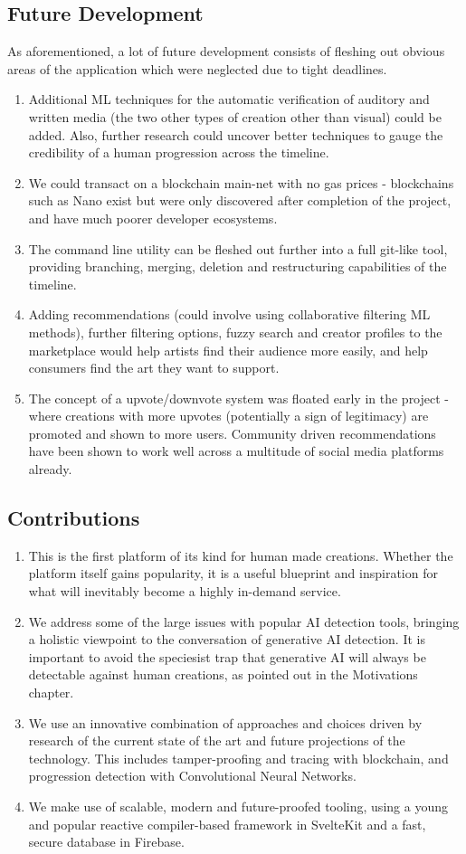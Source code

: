 \documentclass[12pt,a4paper]{article}
\begin{document}
\subsection{Future Development}
As aforementioned, a lot of future development consists of fleshing out obvious areas of the application which were neglected due to tight deadlines.
\begin{enumerate}
    \item Additional ML techniques for the automatic verification of auditory and written media (the two other types of creation other than visual) could be added. Also, further research could uncover better techniques to gauge the credibility of a human progression across the timeline.
    \item We could transact on a blockchain main-net with no gas prices - blockchains such as Nano \cite{nano} exist but were only discovered after completion of the project, and have much poorer developer ecosystems. 
    \item The command line utility can be fleshed out further into a full git-like tool, providing branching, merging, deletion and restructuring capabilities of the timeline.
    \item Adding recommendations (could involve using collaborative filtering ML methods), further filtering options, fuzzy search and creator profiles to the marketplace would help artists find their audience more easily, and help consumers find the art they want to support.  
    \item The concept of a upvote/downvote system was floated early in the project - where creations with more upvotes (potentially a sign of legitimacy) are promoted and shown to more users. Community driven recommendations have been shown to work well across a multitude of social media platforms already.
\end{enumerate}
\subsection{Contributions}
\begin{enumerate}
    \item This is the first platform of its kind for human made creations. Whether the platform itself gains popularity, it is a useful blueprint and inspiration for what will inevitably become a highly in-demand service.
    \item We address some of the large issues with popular AI detection tools, bringing a holistic viewpoint to the conversation of generative AI detection. It is important to avoid the speciesist trap that generative AI will always be detectable against human creations, as pointed out in the Motivations chapter.
    \item We use an innovative combination of approaches and choices driven by research of the current state of the art and future projections of the technology. This includes tamper-proofing and tracing with blockchain, and progression detection with Convolutional Neural Networks.
    \item We make use of scalable, modern and future-proofed tooling, using a young and popular reactive compiler-based framework in SvelteKit and a fast, secure database in Firebase.
\end{enumerate}
\end{document}
